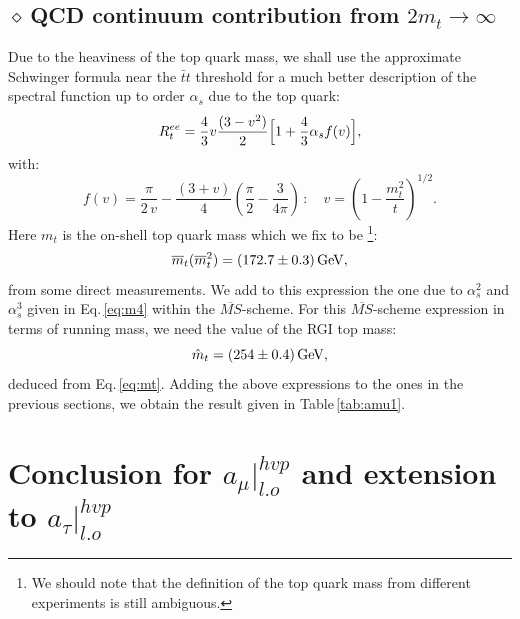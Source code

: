 \documentclass[review]{elsarticle}
\def\beq{\begin{equation}}
\def\eeq{\end{equation}}
\def\ga{\left(}
\def\dr{\right)}
\def\d{$\diamond~$}
\begin{document}
\subsection*{ \vspace*{0.5cm} \d QCD continuum contribution from  $2m_t\to\infty$}
Due to the heaviness of the top quark mass, we shall use the approximate Schwinger formula near the $\bar tt$ threshold
for a much better description of the spectral function up to order $\alpha_s$ due to the top quark:
\beq
R_t^{ee}=\frac{4}{3} v\frac{(3-v^2)}{2}\Big{[} 1+\frac{4}{3}\alpha_sf(v)\Big{]},
\eeq
with:
\beq
f(v)=\frac{\pi}{2\, v}-\frac{(3+v)}{4}\ga \frac{\pi}{2}-\frac{3}{4\pi}\dr\,:\,\,\,\,\,\, v=\ga 1-\frac{m_t^2}{t}\dr^{1/2}.
\eeq
Here $m_t$ is the on-shell top quark mass which we fix to be\,\cite{PDG}\,\footnote{We should note that the definition of the top quark mass from different experiments is still ambiguous.}: 
\beq
\overline{m}_t(\overline{m}_t^2)=(172.7\pm 0.3)\,{\rm  GeV},
\label{eq:mt}
\eeq
 from some  direct measurements.
We add to this expression the  one due to $\alpha_s^2$ and $\alpha_s^3$ given in Eq.\,\ref{eq:m4} within the $\overline {MS}$-scheme.  For this $\overline {MS}$-scheme expression  in terms of running mass, we need the value of the RGI top mass:
\beq
\hat m_t=(254\pm 0.4)\,{\rm GeV},
\eeq
deduced from Eq.\,\ref{eq:mt}.
Adding the above expressions to the ones in the previous sections, we obtain the result given in Table\,\ref{tab:amu1}. 
\section{Conclusion for $a_\mu\vert^{hvp}_{l.o}$ and extension to $a_\tau\vert^{hvp}_{l.o}$}
\end{document}
